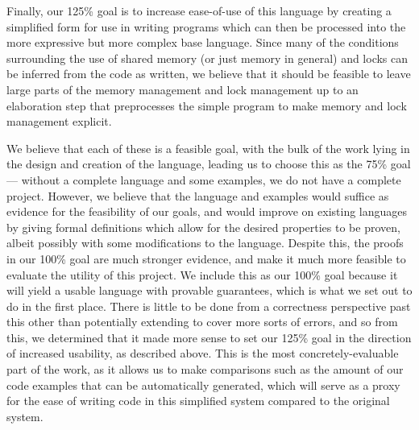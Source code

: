 \documentclass{article}
\begin{document}
Finally, our 125\% goal is to increase ease-of-use of this language by creating a simplified form for use in writing programs which can then be processed into the more expressive but more complex base language.
Since many of the conditions surrounding the use of shared memory (or just memory in general) and locks can be inferred from the code as written, we believe that it should be feasible to leave large parts of the memory management and lock management up to an elaboration step that preprocesses the simple program to make memory and lock management explicit.

We believe that each of these is a feasible goal, with the bulk of the work lying in the design and creation of the language, leading us to choose this as the 75\% goal --- without a complete language and some examples, we do not have a complete project.
However, we believe that the language and examples would suffice as evidence for the feasibility of our goals, and would improve on existing languages by giving formal definitions which allow for the desired properties to be proven, albeit possibly with some modifications to the language.
Despite this, the proofs in our 100\% goal are much stronger evidence, and make it much more feasible to evaluate the utility of this project.
We include this as our 100\% goal because it will yield a usable language with provable guarantees, which is what we set out to do in the first place.
There is little to be done from a correctness perspective past this other than potentially extending to cover more sorts of errors, and so from this, we determined that it made more sense to set our 125\% goal in the direction of increased usability, as described above.
This is the most concretely-evaluable part of the work, as it allows us to make comparisons such as the amount of our code examples that can be automatically generated, which will serve as a proxy for the ease of writing code in this simplified system compared to the original system.




\end{document}
